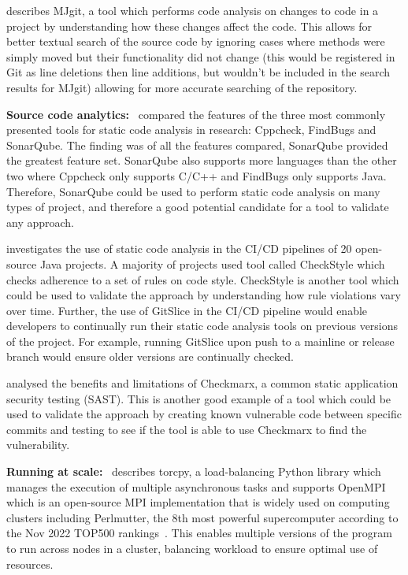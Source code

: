 \cite{mjgit} describes MJgit, a tool which performs code analysis on changes to code in a project by understanding how these changes affect the code.
This allows for better textual search of the source code by ignoring cases where methods were simply moved but their functionality did not change (this would be registered in Git as line deletions then line additions, but wouldn't be included in the search results for MJgit) allowing for more accurate searching of the repository.

\textbf{Source code analytics:}~\cite{sonarqube} compared the features of the three most commonly presented tools for static code analysis in research: Cppcheck, FindBugs and SonarQube.
The finding was of all the features compared, SonarQube provided the greatest feature set.
SonarQube also supports more languages than the other two where Cppcheck only supports C/C++ and FindBugs only supports Java.
Therefore, SonarQube could be used to perform static code analysis on many types of project, and therefore a good potential candidate for a tool to validate any approach.

\cite{java_ci_sca} investigates the use of static code analysis in the CI/CD pipelines of 20 open-source Java projects.
A majority of projects used tool called CheckStyle which checks adherence to a set of rules on code style.
CheckStyle is another tool which could be used to validate the approach by understanding how rule violations vary over time.
Further, the use of GitSlice in the CI/CD pipeline would enable developers to continually run their static code analysis tools on previous versions of the project.
For example, running GitSlice upon push to a mainline or release branch would ensure older versions are continually checked.

\cite{li_2020} analysed the benefits and limitations of Checkmarx, a common static application security testing (SAST).
This is another good example of a tool which could be used to validate the approach by creating known vulnerable code between specific commits and testing to see if the tool is able to use Checkmarx to find the vulnerability.

\textbf{Running at scale:}~\cite{torcpy} describes torcpy, a load-balancing Python library which manages the execution of multiple asynchronous tasks and supports OpenMPI which is an open-source MPI implementation that is widely used on computing clusters including Perlmutter, the 8th most powerful supercomputer according to the Nov 2022 TOP500 rankings~\cite{perlmutter}.
This enables multiple versions of the program to run across nodes in a cluster, balancing workload to ensure optimal use of resources.

